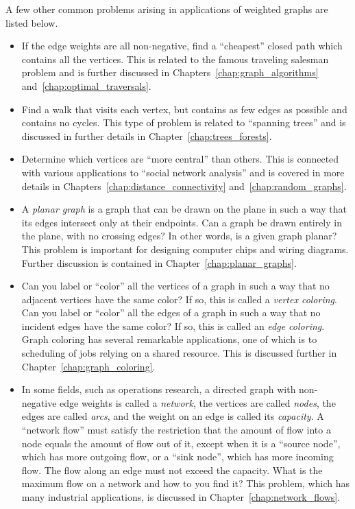 A few other common problems arising in applications of weighted graphs
are listed below.

\begin{itemize}
\item If the edge weights are all non-negative, find a ``cheapest''
  closed path which contains all the vertices. This is related to the
  famous traveling salesman problem and is further discussed in
  Chapters~\ref{chap:graph_algorithms} and~\ref{chap:optimal_traversals}.

\item Find a walk that visits each vertex, but contains as few edges
  as possible and contains no cycles. This type of problem is related
  to ``spanning trees'' and is discussed in further details in
  Chapter~\ref{chap:trees_forests}.

\item Determine which vertices are ``more central'' than others. This
  is connected with various applications to
  ``social network analysis'' and is covered in more details in
  Chapters~\ref{chap:distance_connectivity}
  and~\ref{chap:random_graphs}.

\item A \emph{planar graph} is a graph that can be drawn on the plane
  in such a way that its edges intersect only at their endpoints. Can
  a graph be drawn entirely in the plane, with no crossing edges? In
  other words, is a given graph planar? This problem is important for
  designing computer chips and wiring diagrams. Further discussion is
  contained in Chapter~\ref{chap:planar_graphs}.

\item Can you label or ``color'' all the vertices of a graph in such a
  way that no adjacent vertices have the same color? If so, this is
  called a \emph{vertex coloring}. Can you label or ``color'' all the
  edges of a graph in such a way that no incident edges have the same
  color? If so, this is called an \emph{edge coloring}. Graph coloring
  has several remarkable applications, one of which is to scheduling
  of jobs relying on a shared resource. This is discussed further in
  Chapter~\ref{chap:graph_coloring}.

\item In some fields, such as operations research, a directed graph
  with non-negative edge weights is called a \emph{network}, the
  vertices are called \emph{nodes}, the edges are called \emph{arcs},
  and the weight on an edge is called its \emph{capacity}. A
  ``network flow'' must satisfy the restriction that the amount of
  flow into a node equals the amount of flow out of it, except when it
  is a ``source node'', which has more outgoing flow, or a ``sink
  node'', which has more incoming flow. The flow along an edge must
  not exceed the capacity. What is the maximum flow on a network
  and how to you find it? This problem, which has many industrial
  applications, is discussed in Chapter~\ref{chap:network_flows}.
\end{itemize}


